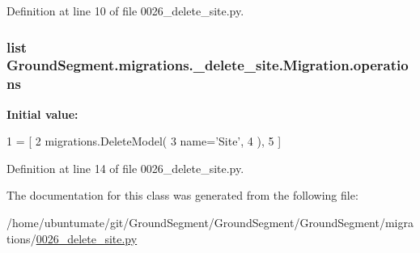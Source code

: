 Definition at line 10 of file 0026\+\_\+delete\+\_\+site.\+py.

\hypertarget{class_ground_segment_1_1migrations_1_10026__delete__site_1_1_migration_a01b8f880d65e82337e5c982f032582f2}{}
\subsubsection[{operations}]{\setlength{\rightskip}{0pt plus 5cm}list Ground\+Segment.\+migrations.\+\_\+delete\+\_\+site.\+Migration.\+operations\hspace{0.3cm}{\ttfamily [static]}}\label{class_ground_segment_1_1migrations_1_10026__delete__site_1_1_migration_a01b8f880d65e82337e5c982f032582f2}
{\bfseries Initial value\+:}
\begin{DoxyCode}
1 = [
2         migrations.DeleteModel(
3             name=\textcolor{stringliteral}{'Site'},
4         ),
5     ]
\end{DoxyCode}


Definition at line 14 of file 0026\+\_\+delete\+\_\+site.\+py.



The documentation for this class was generated from the following file\+:\begin{DoxyCompactItemize}
\item 
/home/ubuntumate/git/\+Ground\+Segment/\+Ground\+Segment/\+Ground\+Segment/migrations/\hyperlink{0026__delete__site_8py}{0026\+\_\+delete\+\_\+site.\+py}\end{DoxyCompactItemize}
